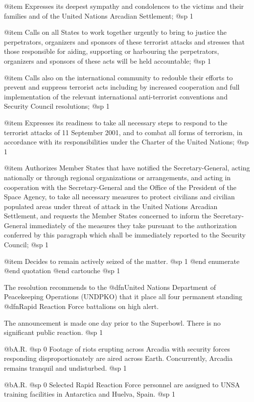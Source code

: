 @item
Expresses its deepest sympathy and condolences to the victims and their families and of the United Nations Arcadian Settlement;
@sp 1

@item
Calls on all States to work together urgently to bring to justice the perpetrators, organizers and sponsors of these terrorist attacks and stresses that those responsible for aiding, supporting or harbouring the perpetrators, organizers and sponsors of these acts will be held accountable;
@sp 1

@item
Calls also on the international community to redouble their efforts to prevent and suppress terrorist acts including by increased cooperation and full implementation of the relevant international anti-terrorist conventions and Security Council resolutions;
@sp 1

@item
Expresses its readiness to take all necessary steps to respond to the terrorist attacks of 11 September 2001, and to combat all forms of terrorism, in accordance with its responsibilities under the Charter of the United Nations;
@sp 1

@item
Authorizes Member States that have notified the Secretary-General, acting nationally or through regional organizations or arrangements, and acting in cooperation with the Secretary-General and the Office of the President of the Space Agency, to take all necessary measures to protect civilians and civilian populated areas under threat of attack in the United Nations Arcadian Settlement, and requests the Member States concerned to inform the Secretary-General immediately of the measures they take pursuant to the authorization conferred by this paragraph which shall be immediately reported to the Security Council;
@sp 1

@item
Decides to remain actively seized of the matter.
@sp 1
@end enumerate
@end quotation
@end cartouche
@sp 1

The resolution recommends to the @dfn{United Nations Department of Peacekeeping Operations} (UNDPKO) that it place all four permanent standing @dfn{Rapid Reaction Force} battalions on high alert.

The announcement is made one day prior to the Superbowl. There is no significant public reaction.
@sp 1

@b{A.R.}
@sp 0
Footage of riots erupting across Arcadia with security forces responding disproportionately are aired across Earth. Concurrently, Arcadia remains tranquil and undisturbed.
@sp 1

@b{A.R.}
@sp 0
Selected Rapid Reaction Force personnel are assigned to UNSA training facilities in Antarctica and Huelva, Spain.
@sp 1

